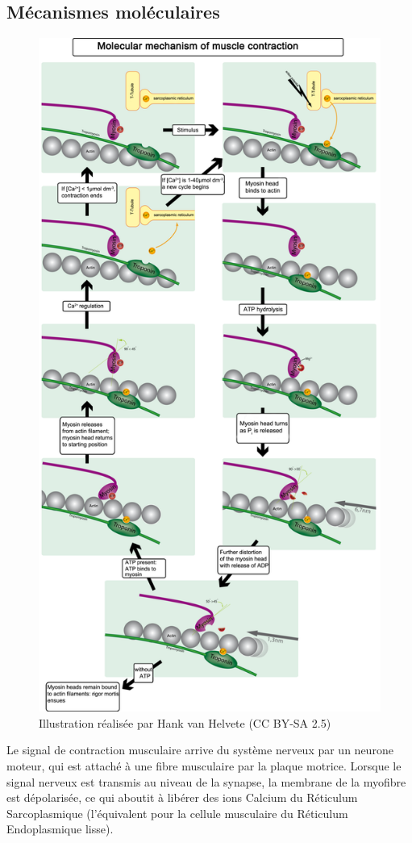 \subsection{Mécanismes moléculaires}
\begin{figure}[p]
\includegraphics[scale=0.3]{Figures/Contraction.png}
\caption{Illustration réalisée par Hank van Helvete (CC BY-SA 2.5)}
\end{figure}
Le signal de contraction musculaire arrive du système nerveux par un neurone moteur, qui est attaché à une fibre musculaire par la plaque motrice.
Lorsque le signal nerveux est transmis au niveau de la synapse, la membrane de la myofibre est dépolarisée, ce qui aboutit à libérer des ions Calcium du Réticulum Sarcoplasmique (l'équivalent pour la cellule musculaire du Réticulum Endoplasmique lisse). 

